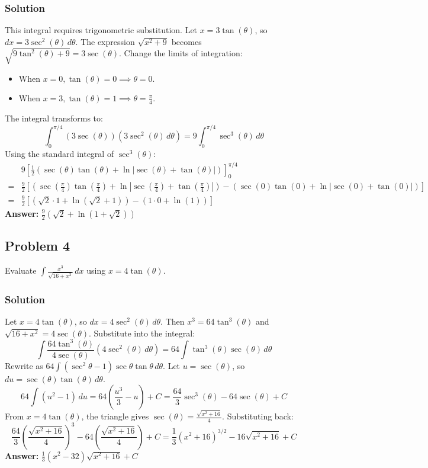 \documentclass{article}
\begin{document}
\subsubsection*{Solution}
This integral requires trigonometric substitution. Let $ x = 3 \tan(\theta) $, so $ dx = 3 \sec^2(\theta) \,d\theta $.
The expression $ \sqrt{x^2 + 9} $ becomes $ \sqrt{9 \tan^2(\theta) + 9} = 3 \sec(\theta) $.
Change the limits of integration:
\begin{itemize}
    \item When $ x = 0, \tan(\theta) = 0 \implies \theta = 0 $.
    \item When $ x = 3, \tan(\theta) = 1 \implies \theta = \frac{\pi}{4} $.
\end{itemize}
The integral transforms to:
\[ \int_{0}^{\pi/4} (3 \sec(\theta)) (3 \sec^2(\theta) \,d\theta) = 9 \int_{0}^{\pi/4} \sec^3(\theta) \,d\theta \]
Using the standard integral of $ \sec^3(\theta) $:
\begin{align*}
& 9 \left[ \frac{1}{2}(\sec(\theta)\tan(\theta) + \ln|\sec(\theta) + \tan(\theta)|) \right]_{0}^{\pi/4} \\
=& \frac{9}{2} [(\sec(\tfrac{\pi}{4})\tan(\tfrac{\pi}{4}) + \ln|\sec(\tfrac{\pi}{4}) + \tan(\tfrac{\pi}{4})|) - (\sec(0)\tan(0) + \ln|\sec(0) + \tan(0)|)] \\
=& \frac{9}{2} [(\sqrt{2} \cdot 1 + \ln(\sqrt{2} + 1)) - (1 \cdot 0 + \ln(1))]
\end{align*}
\textbf{Answer:} $ \frac{9}{2}(\sqrt{2} + \ln(1 + \sqrt{2})) $
 

\subsection{Problem 4}
Evaluate $ \int \frac{x^3}{\sqrt{16 + x^2}} \,dx $ using $ x = 4 \tan(\theta) $.
\subsubsection*{Solution}
Let $ x = 4 \tan(\theta) $, so $ dx = 4 \sec^2(\theta) \,d\theta $.
Then $ x^3 = 64 \tan^3(\theta) $ and $ \sqrt{16 + x^2} = 4 \sec(\theta) $.
Substitute into the integral:
\[ \int \frac{64 \tan^3(\theta)}{4 \sec(\theta)} (4 \sec^2(\theta) \,d\theta) = 64 \int \tan^3(\theta)\sec(\theta) \,d\theta \]
Rewrite as $ 64 \int (\sec^2\theta - 1) \sec\theta\tan\theta \,d\theta $. Let $ u = \sec(\theta) $, so $ du = \sec(\theta)\tan(\theta) \,d\theta $.
\[ 64 \int (u^2 - 1) \,du = 64\left(\frac{u^3}{3} - u\right) + C = \frac{64}{3}\sec^3(\theta) - 64\sec(\theta) + C \]
From $ x = 4 \tan(\theta) $, the triangle gives $ \sec(\theta) = \frac{\sqrt{x^2 + 16}}{4} $. Substituting back:
\[ \frac{64}{3}\left(\frac{\sqrt{x^2 + 16}}{4}\right)^3 - 64\left(\frac{\sqrt{x^2 + 16}}{4}\right) + C = \frac{1}{3}(x^2+16)^{3/2} - 16\sqrt{x^2+16} + C \]
\textbf{Answer:} $ \frac{1}{3}(x^2 - 32)\sqrt{x^2 + 16} + C $
\end{document}
